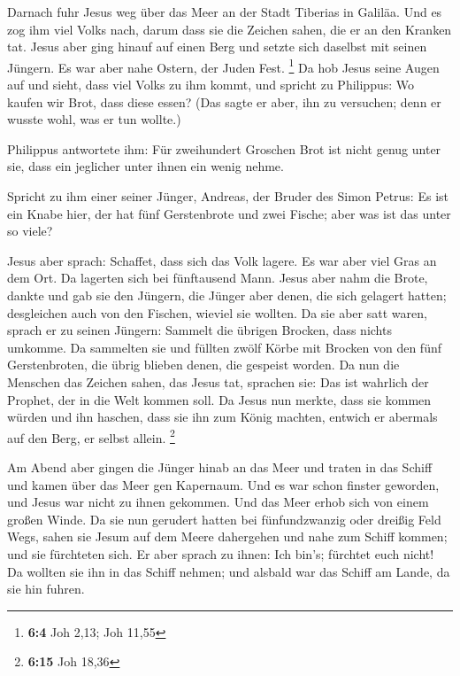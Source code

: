  Darnach fuhr Jesus weg über das Meer an der Stadt Tiberias
in Galiläa.  Und es zog ihm viel Volks nach, darum dass sie
die Zeichen sahen, die er an den Kranken tat.  Jesus aber
ging hinauf auf einen Berg und setzte sich daselbst mit seinen Jüngern.
 Es war aber nahe Ostern, der Juden Fest. \footnote{\textbf{6:4}
  Joh 2,13; Joh 11,55}  Da hob Jesus seine Augen auf und
sieht, dass viel Volks zu ihm kommt, und spricht zu Philippus: Wo kaufen
wir Brot, dass diese essen?  (Das sagte er aber, ihn zu
versuchen; denn er wusste wohl, was er tun wollte.)

 Philippus antwortete ihm: Für zweihundert Groschen Brot ist
nicht genug unter sie, dass ein jeglicher unter ihnen ein wenig nehme.

 Spricht zu ihm einer seiner Jünger, Andreas, der Bruder des
Simon Petrus:  Es ist ein Knabe hier, der hat fünf
Gerstenbrote und zwei Fische; aber was ist das unter so viele?

 Jesus aber sprach: Schaffet, dass sich das Volk lagere. Es
war aber viel Gras an dem Ort. Da lagerten sich bei fünftausend Mann.
 Jesus aber nahm die Brote, dankte und gab sie den Jüngern,
die Jünger aber denen, die sich gelagert hatten; desgleichen auch von
den Fischen, wieviel sie wollten.  Da sie aber satt waren,
sprach er zu seinen Jüngern: Sammelt die übrigen Brocken, dass nichts
umkomme.  Da sammelten sie und füllten zwölf Körbe mit
Brocken von den fünf Gerstenbroten, die übrig blieben denen, die
gespeist worden.  Da nun die Menschen das Zeichen sahen,
das Jesus tat, sprachen sie: Das ist wahrlich der Prophet, der in die
Welt kommen soll.  Da Jesus nun merkte, dass sie kommen
würden und ihn haschen, dass sie ihn zum König machten, entwich er
abermals auf den Berg, er selbst allein. \footnote{\textbf{6:15} Joh
  18,36}

 Am Abend aber gingen die Jünger hinab an das Meer
 und traten in das Schiff und kamen über das Meer gen
Kapernaum. Und es war schon finster geworden, und Jesus war nicht zu
ihnen gekommen.  Und das Meer erhob sich von einem großen
Winde.  Da sie nun gerudert hatten bei fünfundzwanzig oder
dreißig Feld Wegs, sahen sie Jesum auf dem Meere dahergehen und nahe zum
Schiff kommen; und sie fürchteten sich.  Er aber sprach zu
ihnen: Ich bin's; fürchtet euch nicht!  Da wollten sie ihn
in das Schiff nehmen; und alsbald war das Schiff am Lande, da sie hin
fuhren.

